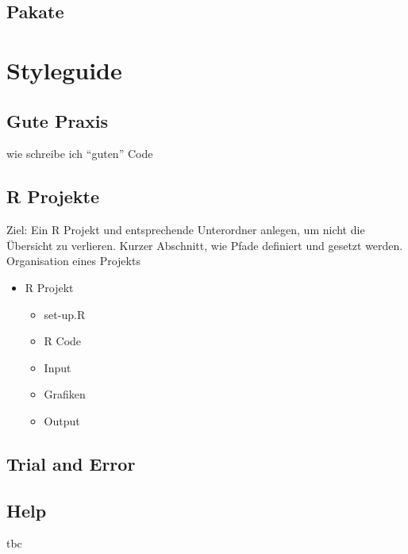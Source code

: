 \documentclass[
]{book}
\providecommand{\tightlist}{%
  \setlength{\itemsep}{0pt}\setlength{\parskip}{0pt}}
\begin{document}
\hypertarget{pakate}{%
\section{Pakate}\label{pakate}}

\hypertarget{styleguide}{%
\chapter{Styleguide}\label{styleguide}}

\hypertarget{gute-praxis}{%
\section{Gute Praxis}\label{gute-praxis}}

wie schreibe ich ``guten'' Code

\hypertarget{r-projekte}{%
\section{R Projekte}\label{r-projekte}}

Ziel: Ein R Projekt und entsprechende Unterordner anlegen, um nicht die Übersicht zu verlieren. Kurzer Abschnitt, wie Pfade definiert und gesetzt werden.
Organisation eines Projekts

\begin{itemize}
\tightlist
\item
  R Projekt

  \begin{itemize}
  \tightlist
  \item
    set-up.R
  \item
    R Code
  \item
    Input
  \item
    Grafiken
  \item
    Output
  \end{itemize}
\end{itemize}

\hypertarget{trial-and-error}{%
\section{Trial and Error}\label{trial-and-error}}

\hypertarget{help}{%
\section{Help}\label{help}}

tbc

  
\end{document}
